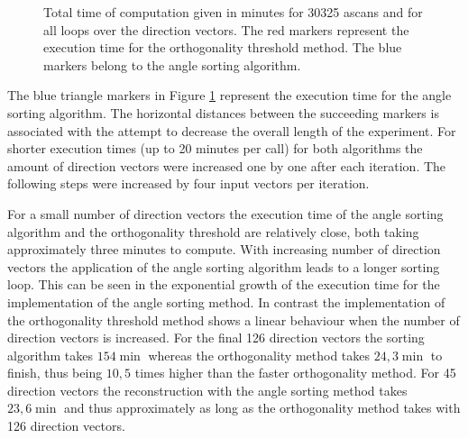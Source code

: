 \begin{figure}[H]
    \centering
    \caption{Total time of computation given in minutes for 30325 \acp{ascan} and for all loops over the direction vectors. The red markers represent the execution time for the orthogonality threshold method. The blue markers belong to the angle sorting algorithm.}
    \label{fig:Complete_computation_all_vecs}
\end{figure}

The blue triangle markers in Figure \ref{fig:Complete_computation_all_vecs} represent the execution time for the angle sorting algorithm. The horizontal distances between the succeeding markers is associated with the attempt to decrease the overall length of the experiment. For shorter execution times (up to 20 minutes per call) for both algorithms the amount of direction vectors were increased one by one after each iteration. The following steps were increased by four input vectors per iteration.

For a small number of direction vectors the execution time of the angle sorting algorithm and the orthogonality threshold are relatively close, both taking approximately three minutes to compute. With increasing number of direction vectors the application of the angle sorting algorithm leads to a longer sorting loop. This can be seen in the exponential growth of the execution time for the implementation of the angle sorting method. In contrast the implementation of the orthogonality threshold method shows a linear behaviour when the number of direction vectors is increased. For the final 126 direction vectors the sorting algorithm takes $154 \min$ whereas the orthogonality method takes $24,3 \min$ to finish, thus being $10,5$ times higher than the faster orthogonality method. For 45 direction vectors the reconstruction with the angle sorting method takes $23,6 \min$ and thus approximately as long as the orthogonality method takes with 126 direction vectors.

